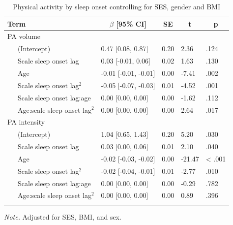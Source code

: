 \documentclass[
  man]{apa6}
\begin{document}
\begin{table}[tbp]

\begin{center}
\begin{threeparttable}

\caption{\label{tab:PA-by-sleep-onset}Physical activity by sleep onset controlling for SES, gender and BMI}

\begin{tabular}{lllll}
\toprule
Term & \multicolumn{1}{c}{$\beta$ [95\% CI]} & \multicolumn{1}{c}{SE} & \multicolumn{1}{c}{t} & \multicolumn{1}{c}{p}\\
\midrule
PA volume &  &  &  & \\
\ \ \ (Intercept) & 0.47 [0.08, 0.87] & 0.20 & 2.36 & .124\\
\ \ \ Scale sleep onset lag & 0.03 [-0.01, 0.06] & 0.02 & 1.63 & .130\\
\ \ \ Age & -0.01 [-0.01, -0.01] & 0.00 & -7.41 & .002\\
\ \ \ Scale sleep onset lag$^2$ & -0.05 [-0.07, -0.03] & 0.01 & -4.52 & .001\\
\ \ \ Scale sleep onset lag:age & 0.00 [0.00, 0.00] & 0.00 & -1.62 & .112\\
\ \ \ Age:scale sleep onset lag$^2$ & 0.00 [0.00, 0.00] & 0.00 & 2.64 & .017\\
PA intensity &  &  &  & \\
\ \ \ (Intercept) & 1.04 [0.65, 1.43] & 0.20 & 5.20 & .030\\
\ \ \ Scale sleep onset lag & 0.03 [0.00, 0.06] & 0.01 & 2.10 & .040\\
\ \ \ Age & -0.02 [-0.03, -0.02] & 0.00 & -21.47 & < .001\\
\ \ \ Scale sleep onset lag$^2$ & -0.02 [-0.04, -0.01] & 0.01 & -2.77 & .010\\
\ \ \ Scale sleep onset lag:age & 0.00 [0.00, 0.00] & 0.00 & -0.29 & .782\\
\ \ \ Age:scale sleep onset lag$^2$ & 0.00 [0.00, 0.00] & 0.00 & 0.89 & .396\\
\bottomrule
\addlinespace
\end{tabular}

\begin{tablenotes}[para]
\normalsize{\textit{Note.} Adjusted for SES, BMI, and sex. }
\end{tablenotes}

\end{threeparttable}
\end{center}

\end{table}
\end{document}
